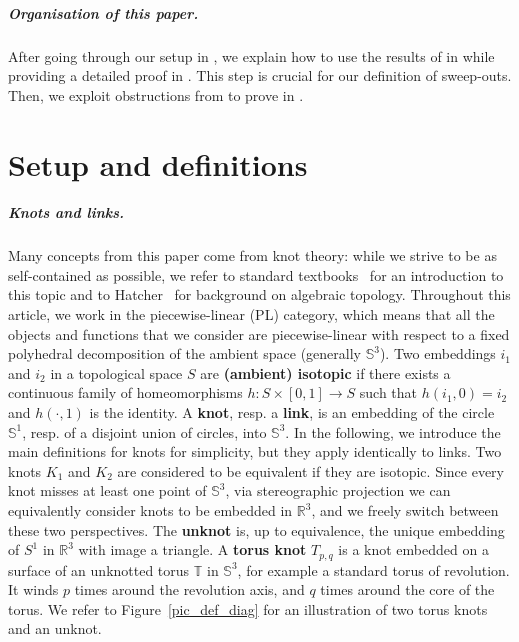 \documentclass[10pt,a4paper]{amsart}
\newcommand{\To}{\mathbb{T}}
\newcommand{\Sp}{\mathbb{S}}
\begin{document}
\subparagraph*{Organisation of this paper.}
After going through our setup in , we explain how to use the results of \cite{Chambers_homo-isotopy} in  while providing a detailed proof in . This step is crucial for our definition of sweep-outs. Then, we exploit obstructions from \cite{Lunel_spherewidth_out} to prove  in . 


\section{Setup and definitions}\label{sec_prelim}

\subparagraph*{Knots and links.} Many concepts from this paper come from knot theory: while we strive to be as self-contained as possible, we refer to standard textbooks~\cite{burde2002knots,Rolfsen_Knots} for an introduction to this topic and to Hatcher~\cite{Hatcher_Algebraic_Topology} for background on algebraic topology. Throughout this article, we work in the piecewise-linear (PL) category, which means that all the objects and functions that we consider are piecewise-linear with respect to a fixed polyhedral decomposition of the ambient space (generally $\Sp^3$). Two embeddings $i_1$ and $i_2$ in a topological space $S$ are \textbf{(ambient) isotopic} if there exists a continuous family of homeomorphisms $h: S \times[0,1] \rightarrow S$ such that $h (i_1,0) =i_2$ and $h(\cdot,1)$ is the identity. A \textbf{knot}, resp. a \textbf{link}, is an embedding of the circle $\Sp^1$, resp. of a disjoint union of circles, into $\Sp^3$. In the following, we introduce the main definitions for knots for simplicity, but they apply identically to links. Two knots $K_1$ and $K_2$ are considered to be equivalent if they are isotopic. Since every knot misses at least one point of $\Sp^3$, via stereographic projection we can equivalently consider knots to be embedded in $\mathbb{R}^3$, and we freely switch between these two perspectives. The \textbf{unknot} is, up to equivalence, the unique embedding of $S^1$ in $\mathbb{R}^3$ with image a triangle. A \textbf{torus knot} $T_{p,q}$ is a knot embedded on a surface of an unknotted torus $\To$ in $\mathbb{S}^3$, for example a standard torus of revolution. It winds $p$ times around the revolution axis, and $q$ times around the core of the torus. We refer to Figure~\ref{pic_def_diag} for an illustration of two torus knots and an unknot.
\end{document}
